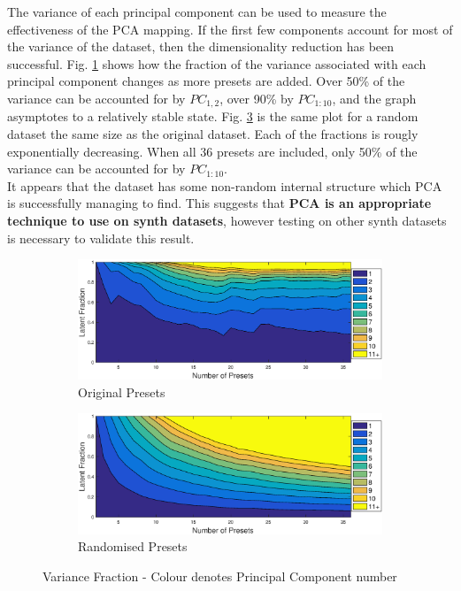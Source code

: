 \documentclass[11pt, oneside]{report}   	%
\begin{document}
The variance of each principal component can be used to measure the effectiveness of the PCA mapping. If the first few components account for most of the variance of the dataset, then the dimensionality reduction has been successful.
Fig. \ref{fig:LatentOriginal} shows how the fraction of the variance associated with each principal component changes as more presets are added. Over 50\% of the variance can be accounted for by $PC_{1,2}$,  over 90\% by $PC_{1 : 10}$, and the graph asymptotes to a relatively stable state. Fig. \ref{fig:LatentRandom} is the same plot for a random dataset the same size as the original dataset. Each of the fractions is rougly exponentially decreasing. When all 36 presets are included, only 50\% of the variance can be accounted for by $PC_{1 : 10}$. \\
It appears that the dataset has some non-random internal structure which PCA is successfully managing to find. This suggests that \textbf{PCA is an appropriate technique to use on synth datasets}, however testing on other synth datasets is necessary to validate this result.
\begin{figure}[h]
	\vspace{-5pt}
	\hspace{-40pt}
	\begin{subfigure}{3.5in}
		\includegraphics[trim = {0, 0.1cm, 0, 0.5cm}, clip, width = \textwidth]{LatentFraction.eps}
		\caption{Original Presets}
		\label{fig:LatentOriginal}
	\end{subfigure} 
%
	\begin{subfigure}{3.5in}
		\includegraphics[trim = {0, 0.1cm, 0, 0.5cm}, clip, width = \textwidth]{LatentFractionRandom.eps}
		\caption{Randomised Presets}
		\label{fig:LatentRandom}
	\end{subfigure}
	\caption{Variance Fraction - Colour denotes Principal Component number}
\end{figure}
\end{document}
